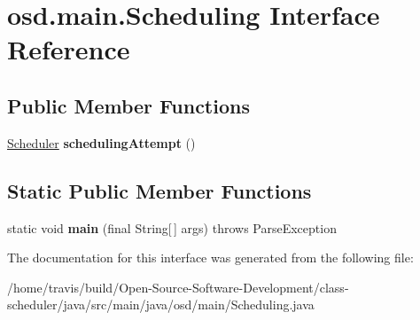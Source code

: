 \hypertarget{interfaceosd_1_1main_1_1_scheduling}{\section{osd.\-main.\-Scheduling Interface Reference}
\label{interfaceosd_1_1main_1_1_scheduling}
}
\subsection*{Public Member Functions}
\begin{DoxyCompactItemize}
\item 
\hypertarget{interfaceosd_1_1main_1_1_scheduling_af6bbed1016f5ec74748faa35699a6d2a}{\hyperlink{interfaceosd_1_1schedule_1_1_scheduler}{Scheduler} {\bfseries scheduling\-Attempt} ()}\label{interfaceosd_1_1main_1_1_scheduling_af6bbed1016f5ec74748faa35699a6d2a}

\end{DoxyCompactItemize}
\subsection*{Static Public Member Functions}
\begin{DoxyCompactItemize}
\item 
\hypertarget{interfaceosd_1_1main_1_1_scheduling_a269ef3f49be0d634e02d7215262d2b85}{static void {\bfseries main} (final String\mbox{[}$\,$\mbox{]} args)  throws Parse\-Exception }\label{interfaceosd_1_1main_1_1_scheduling_a269ef3f49be0d634e02d7215262d2b85}

\end{DoxyCompactItemize}


The documentation for this interface was generated from the following file\-:\begin{DoxyCompactItemize}
\item 
/home/travis/build/\-Open-\/\-Source-\/\-Software-\/\-Development/class-\/scheduler/java/src/main/java/osd/main/Scheduling.\-java\end{DoxyCompactItemize}
